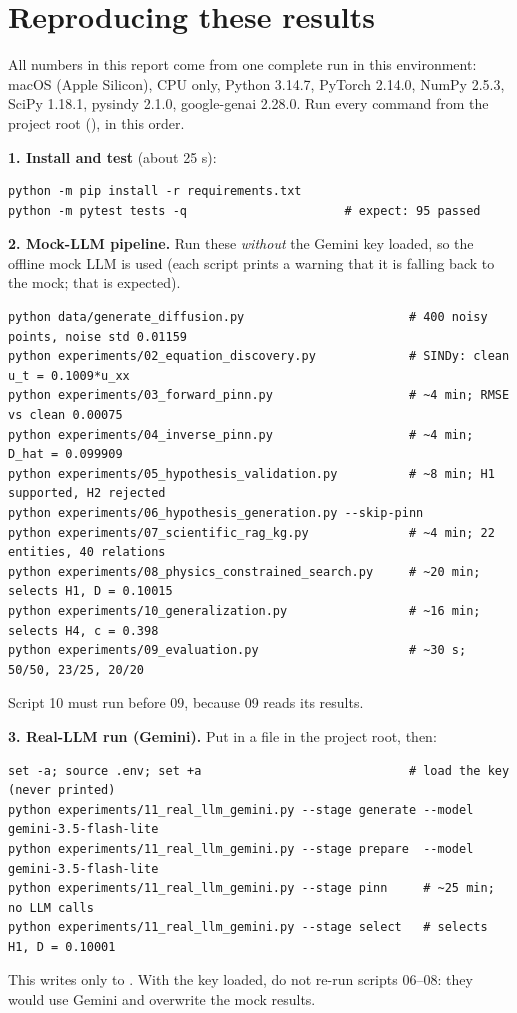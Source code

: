 \documentclass[11pt,a4paper]{article}
\begin{document}
\section{Reproducing these results}\label{sec:repro}
All numbers in this report come from one complete run in this environment: macOS (Apple Silicon), CPU only,
Python 3.14.7, PyTorch 2.14.0, NumPy 2.5.3, SciPy 1.18.1, pysindy 2.1.0, google-genai 2.28.0. Run every command from
the project root (), in this order.

\textbf{1. Install and test} (about 25 s):
{\footnotesize\begin{verbatim}
python -m pip install -r requirements.txt
python -m pytest tests -q                      # expect: 95 passed
\end{verbatim}}

\textbf{2. Mock-LLM pipeline.} Run these \emph{without} the Gemini key loaded, so the offline mock LLM is used
(each script prints a warning that it is falling back to the mock; that is expected).
{\footnotesize\begin{verbatim}
python data/generate_diffusion.py                       # 400 noisy points, noise std 0.01159
python experiments/02_equation_discovery.py             # SINDy: clean u_t = 0.1009*u_xx
python experiments/03_forward_pinn.py                   # ~4 min; RMSE vs clean 0.00075
python experiments/04_inverse_pinn.py                   # ~4 min; D_hat = 0.099909
python experiments/05_hypothesis_validation.py          # ~8 min; H1 supported, H2 rejected
python experiments/06_hypothesis_generation.py --skip-pinn
python experiments/07_scientific_rag_kg.py              # ~4 min; 22 entities, 40 relations
python experiments/08_physics_constrained_search.py     # ~20 min; selects H1, D = 0.10015
python experiments/10_generalization.py                 # ~16 min; selects H4, c = 0.398
python experiments/09_evaluation.py                     # ~30 s; 50/50, 23/25, 20/20
\end{verbatim}}
Script 10 must run before 09, because 09 reads its results.

\textbf{3. Real-LLM run (Gemini).} Put  in a  file in the project root, then:
{\footnotesize\begin{verbatim}
set -a; source .env; set +a                             # load the key (never printed)
python experiments/11_real_llm_gemini.py --stage generate --model gemini-3.5-flash-lite
python experiments/11_real_llm_gemini.py --stage prepare  --model gemini-3.5-flash-lite
python experiments/11_real_llm_gemini.py --stage pinn     # ~25 min; no LLM calls
python experiments/11_real_llm_gemini.py --stage select   # selects H1, D = 0.10001
\end{verbatim}}
This writes only to . With the key loaded, do not re-run scripts 06--08:
they would use Gemini and overwrite the mock results.
\end{document}
